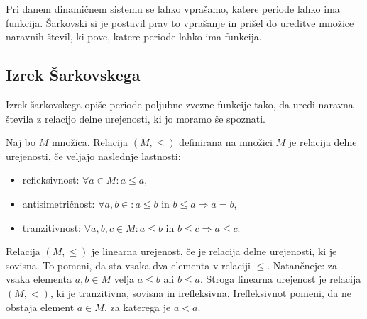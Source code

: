 \documentclass[../TG_magistrsko_delo_sections.tex]{subfiles}
\begin{document}
Pri danem dinamičnem sistemu se lahko vprašamo, katere periode lahko ima funkcija. Šarkovski si je postavil prav to vprašanje in prišel do ureditve množice naravnih števil, ki pove, katere periode lahko ima funkcija.

\subsection{Izrek Šarkovskega}
Izrek šarkovskega opiše periode poljubne zvezne funkcije tako, da uredi naravna števila z relacijo delne urejenosti, ki jo moramo še spoznati.

\begin{definicija}
Naj bo $M$ množica. Relacija $(M,\leq)$ definirana na množici $M$ je relacija delne urejenosti, če veljajo naslednje lastnosti:
\begin{itemize}
\item refleksivnost: $\forall a \in M : a \leq a$,
\item antisimetričnost:  $\forall a, b \in : a \leq b \text{ in } b \leq a \Rightarrow a = b$,
\item tranzitivnost: $\forall a, b, c \in M : a \leq b \text{ in } b \leq c \Rightarrow a \leq c$.
\end{itemize}
Relacija $(M,\leq)$ je linearna urejenost, če je relacija delne urejenosti, ki je sovisna. To pomeni, da sta vsaka dva elementa v relaciji $\leq$. Natančneje: za vsaka elementa $a, b \in M$ velja $a \leq b$ ali $b \leq a$.
Stroga linearna urejenost je relacija $(M, <)$, ki je tranzitivna, sovisna in irefleksivna. Irefleksivnot pomeni, da ne obstaja element $a \in M$, za katerega je $a<a$.
\end{definicija}
\end{document}
